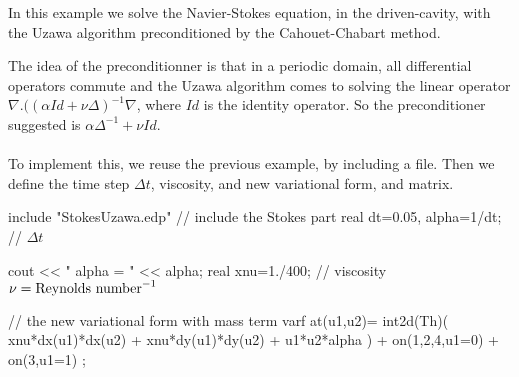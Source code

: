 \documentclass[twoside]{book}
\newif\ifpdf
\begin{document}
\graphicspath{{./}{plots/}}
\ifpdf
\DeclareGraphicsExtensions{.pdf, .jpg, .tif}
\else
{}
\fi

\let\subsubsection\subsection
\let\subsection\section
\let\section\chapter




 In this example we solve the Navier-Stokes  equation,
 in the driven-cavity,
 with the Uzawa  algorithm preconditioned by the Cahouet-Chabart method.

 The idea of the preconditionner is that in a periodic domain, all
 differential operators commute and  the  Uzawa algorithm comes to solving the
 linear operator  $ \nabla. ( (\alpha Id + \nu \Delta)^{-1} \nabla$,
 where $Id$ is the identity operator.
 So  the preconditioner suggested is $ \alpha \Delta^{-1} + \nu Id$.
\\\\
To implement this, we reuse the previous example, by including  a file.
Then we define the time step $ \Delta t$, viscosity, and new variational form, and matrix.

\bFF

include "StokesUzawa.edp" // include the Stokes part
real dt=0.05, alpha=1/dt;  // $ \Delta t$

cout << " alpha = " << alpha;
real xnu=1./400; // viscosity $ \nu = {\hbox{Reynolds number}}^{-1} $

//  the new variational form with mass term 
varf at(u1,u2)= int2d(Th)( xnu*dx(u1)*dx(u2)
                        + xnu*dy(u1)*dy(u2) + u1*u2*alpha  )
                        +  on(1,2,4,u1=0)  + on(3,u1=1) ;
\end{document}

